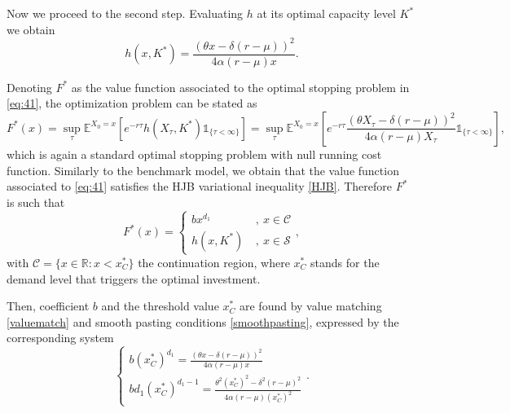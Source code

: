 Now we proceed to the second step. Evaluating $h$ at its optimal capacity level $K^*$ we obtain
$$h(x,K^*)=\frac{(\theta x -\delta (r-\mu))^2}{4 \alpha (r-\mu) x}.$$

Denoting $F^*$ as the value function associated to the optimal stopping problem in \eqref{eq:41}, the optimization problem can be stated as
\begin{equation}
F^*(x)=\sup_\tau \mathds{E}^{X_0=x}\left[ e^{-r\tau}h(X_\tau,K^*) \mathds{1}_{\{\tau<\infty\}} \right]
= \sup_\tau \mathds{E}^{X_0=x}\left[ e^{-r\tau} \frac{(\theta X_\tau -\delta (r-\mu))^2}{4 \alpha (r-\mu) X_\tau} \mathds{1}_{\{\tau<\infty\}}\right],
\label{eq:41}
\end{equation}
which is again a standard optimal stopping problem with null running cost function. Similarly to the benchmark model, we obtain that the value function associated to \eqref{eq:41} satisfies the HJB variational inequality \eqref{HJB}. Therefore $F^*$ is such that
\begin{equation}
F^*(x)=\begin{cases} b x^{d_1}  \ &, \ x \in \mathcal{C} \\
h(x,K^*) \ &, \ x \in \mathcal{S}
\end{cases},
\label{1_F*}
\end{equation}
with $\mathcal{C}=\{x\in \mathds{R}:x< x_C^* \}$ the continuation region, where $x_C^*$ stands for the demand level that triggers the optimal investment.

Then, coefficient $b$ and the threshold value $x_C^*$ are found by value matching \eqref{valuematch} and smooth pasting conditions \eqref{smoothpasting}, expressed by the corresponding system
\begin{equation}
\begin{cases} b (x_C^*)^{d_1}=\frac{(\theta x -\delta (r-\mu))^2}{4 \alpha (r-\mu) x} \\
b d_1(x_C^*)^{d_1-1}=\frac{\theta^2 (x_C^*)^2 -\delta^2 (r-\mu)^2}{4 \alpha (r-\mu) (x_C^*)^2}
\end{cases}.
\label{eq:sistema3}
\end{equation}

